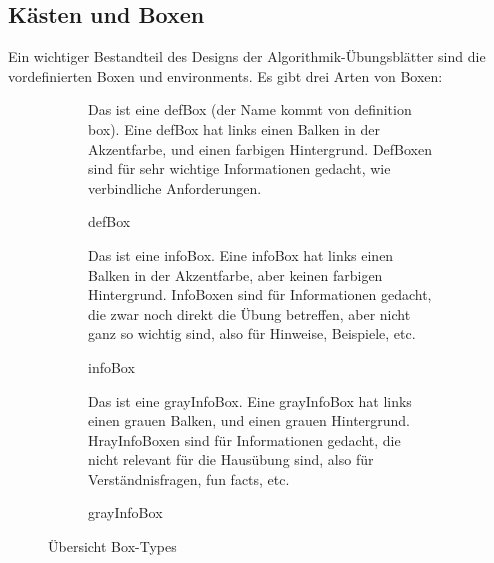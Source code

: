 \documentclass[
    titleprefix=AlgoTeX,
    inlineshortcut=java,
    corporatedesign,
    boxarc,
]{algoexercise}
\begin{document}
    \subsection{Kästen und Boxen}\label{boxes}
    \vspace{-1em}
    Ein wichtiger Bestandteil des Designs der Algorithmik-Übungsblätter sind die vordefinierten Boxen und environments.
    Es gibt drei Arten von Boxen: 

    \begin{figure}[ht!
        ]
        \begin{subfigure}[t]{\textwidth/3-1ex}
            \mbox{}\centering
            \begin{defBox}
                \par
                Das ist eine defBox (der Name kommt von definition box).
                Eine defBox hat links einen Balken in der Akzentfarbe, und einen farbigen Hintergrund.
                DefBoxen sind für sehr wichtige Informationen gedacht, wie verbindliche Anforderungen.
            \end{defBox}
            \caption{defBox}
            \label{fig:box-types:def}
        \end{subfigure}
        \hfill%
        \begin{subfigure}[t]{\textwidth/3-1ex}
            \mbox{}\centering
            \begin{infoBox}
                \par
                Das ist eine infoBox.
                Eine infoBox hat links einen Balken in der Akzentfarbe, aber keinen farbigen Hintergrund.
                InfoBoxen sind für Informationen gedacht, die zwar noch direkt die Übung betreffen, aber nicht ganz so wichtig sind, also für
                Hinweise, Beispiele, etc.
            \end{infoBox}
            \caption{infoBox} \label{fig:box-types:info}
        \end{subfigure}
        \hfill
        \begin{subfigure}[t]{\textwidth/3-1ex} \mbox{}\centering
            \begin{grayInfoBox}
                \par Das ist eine grayInfoBox.
                Eine grayInfoBox hat links einen grauen Balken, und einen grauen Hintergrund.
                HrayInfoBoxen sind für Informationen gedacht, die nicht relevant für die Hausübung sind, also für Verständnisfragen, fun facts,
                etc.
            \end{grayInfoBox}
            \caption{grayInfoBox} \label{fig:box-types:grayInfo}
        \end{subfigure}
        \caption{Übersicht Box-Types}
        \label{fig:box-types}
    \end{figure}
\end{document}
